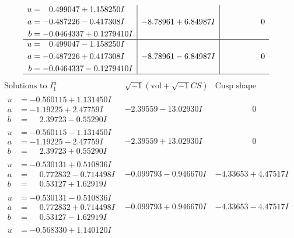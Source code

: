 \documentclass[1p]{elsarticle_modified}
\theoremstyle{definition}
\newcommand{\I}{\sqrt{-1}}
\begin{document}
$$\begin{array}{c|c|c}
\begin{aligned}
u &= \phantom{-}0.499047 + 1.158250 I \\
a &= -0.487226 - 0.417308 I \\
b &= -0.0464337 + 0.1279410 I\end{aligned}
 & -8.78961 + 6.84987 I & \phantom{-0.000000 } 0 \\ \hline\begin{aligned}
u &= \phantom{-}0.499047 - 1.158250 I \\
a &= -0.487226 + 0.417308 I \\
b &= -0.0464337 - 0.1279410 I\end{aligned}
 & -8.78961 - 6.84987 I & \phantom{-0.000000 } 0\\
 \hline 
 \end{array}$$\newpage$$\begin{array}{c|c|c}  
\text{Solutions to }I^u_{1}& \I (\text{vol} + \sqrt{-1}CS) & \text{Cusp shape}\\
 \hline 
\begin{aligned}
u &= -0.560115 + 1.131450 I \\
a &= -1.19225 + 2.47759 I \\
b &= \phantom{-}2.39723 - 0.55290 I\end{aligned}
 & -2.39559 - 13.02930 I & \phantom{-0.000000 } 0 \\ \hline\begin{aligned}
u &= -0.560115 - 1.131450 I \\
a &= -1.19225 - 2.47759 I \\
b &= \phantom{-}2.39723 + 0.55290 I\end{aligned}
 & -2.39559 + 13.02930 I & \phantom{-0.000000 } 0 \\ \hline\begin{aligned}
u &= -0.530131 + 0.510836 I \\
a &= \phantom{-}0.772832 - 0.714498 I \\
b &= \phantom{-}0.53127 + 1.62919 I\end{aligned}
 & -0.099793 - 0.946670 I & -4.33653 + 4.47517 I \\ \hline\begin{aligned}
u &= -0.530131 - 0.510836 I \\
a &= \phantom{-}0.772832 + 0.714498 I \\
b &= \phantom{-}0.53127 - 1.62919 I\end{aligned}
 & -0.099793 + 0.946670 I & -4.33653 - 4.47517 I \\ \hline\begin{aligned}
u &= -0.568330 + 1.140120 I \\

\end{aligned}
\end{array}$$
\end{document}

